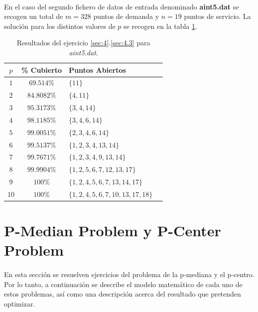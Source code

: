 \documentclass[spanish]{article}
\begin{document}
			\paragraph{}
			En el caso del segundo fichero de datos de entrada denominado \textbf{aint5.dat} se recogen un total de $m = 328$ puntos de demanda y $n=19$ puntos de servicio. La solución para los distintos valores de $p$ se recogen en la tabla \ref{table:sol-4.3b}.

			\begin{table}[h]
				\begin{center}
					\begin{tabular}{|c || c || l || c | }
						\hline
						$p$		&	\% Cubierto	& Puntos Abiertos 						 	\\ \hline \hline
						$1$ 	& $69.514\%$ 	& $\{11\}$ 											\\ \hline
						$2$ 	& $84.8082\%$ & $\{4,11\}$ 										\\ \hline
						$3$ 	& $95.3173\%$ & $\{3,4,14\}$ 									\\ \hline
						$4$ 	& $98.1185\%$ & $\{3,4,6,14\}$ 								\\ \hline
						$5$ 	& $99.0051\%$ & $\{2,3,4,6,14\}$ 							\\ \hline
						$6$ 	& $99.5137\%$ & $\{1,2,3,4,13,14\}$ 					\\ \hline
						$7$ 	& $99.7671\%$ & $\{1,2,3,4,9,13,14\}$ 				\\ \hline
						$8$ 	& $99.9904\%$ & $\{1,2,5,6,7,12,13,17\}$ 			\\ \hline
						$9$ 	& $100\%$ 		& $\{1,2,4,5,6,7,13,14,17\}$		\\ \hline
						$10$ 	& $100\%$ 		& $\{1,2,4,5,6,7,10,13,17,18\}$	\\
						\hline
					\end{tabular}
				\end{center}
				\caption{Resultados del ejercicio \ref{sec:4}.\ref{sec:4.3} para \emph{aint5.dat}.}
				\label{table:sol-4.3b}
			\end{table}

	\section{P-Median Problem y P-Center Problem}
	\label{sec:5}

		\paragraph{}
		En esta sección se resuelven ejercicios del problema de la p-mediana y el p-centro. Por lo tanto, a continuación se describe el modelo matemático de cada uno de estos problemas, así como una descripción acerca del resultado que pretenden optimizar.
\end{document}
